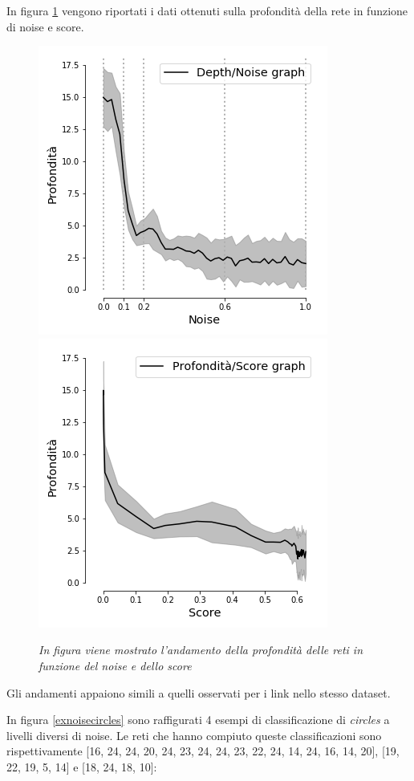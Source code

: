 \documentclass[12pt,a4paper]{report}
\begin{document}
In figura \ref{depth_circles} vengono riportati i dati ottenuti sulla profondità della rete in funzione di noise e score.

\begin{figure}[H]
 \centering
 \includegraphics[scale = 0.5]{images/depth_noise_circles}
 \includegraphics[scale = 0.5]{images/depth_Score_circles}
 \caption {\textit{In figura viene mostrato l'andamento della profondità delle reti in funzione del noise e dello score}}
 \label{depth_circles}
\end{figure}

Gli andamenti appaiono simili a quelli osservati per i link nello stesso dataset.

In figura \ref{exnoisecircles} sono raffigurati 4 esempi di classificazione di \textit{circles} a livelli diversi di noise. Le reti che hanno compiuto queste classificazioni sono rispettivamente [16, 24, 24, 20, 24, 23, 24, 24, 23, 22, 24, 14, 24, 16, 14, 20], [19, 22, 19, 5, 14] e [18, 24, 18, 10]:
\end{document}
